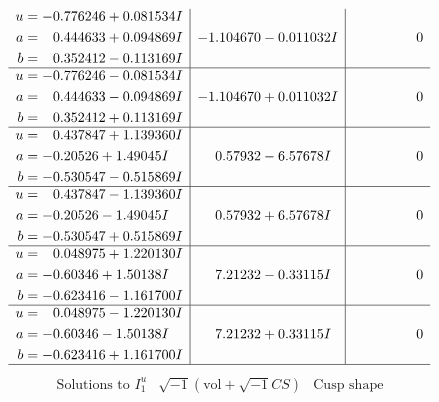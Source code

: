 \documentclass[1p]{elsarticle_modified}
\theoremstyle{definition}
\newcommand{\I}{\sqrt{-1}}
\begin{document}
$$\begin{array}{c|c|c}
\begin{aligned}
u &= -0.776246 + 0.081534 I \\
a &= \phantom{-}0.444633 + 0.094869 I \\
b &= \phantom{-}0.352412 - 0.113169 I\end{aligned}
 & -1.104670 - 0.011032 I & \phantom{-0.000000 } 0 \\ \hline\begin{aligned}
u &= -0.776246 - 0.081534 I \\
a &= \phantom{-}0.444633 - 0.094869 I \\
b &= \phantom{-}0.352412 + 0.113169 I\end{aligned}
 & -1.104670 + 0.011032 I & \phantom{-0.000000 } 0 \\ \hline\begin{aligned}
u &= \phantom{-}0.437847 + 1.139360 I \\
a &= -0.20526 + 1.49045 I \\
b &= -0.530547 - 0.515869 I\end{aligned}
 & \phantom{-}0.57932 - 6.57678 I & \phantom{-0.000000 } 0 \\ \hline\begin{aligned}
u &= \phantom{-}0.437847 - 1.139360 I \\
a &= -0.20526 - 1.49045 I \\
b &= -0.530547 + 0.515869 I\end{aligned}
 & \phantom{-}0.57932 + 6.57678 I & \phantom{-0.000000 } 0 \\ \hline\begin{aligned}
u &= \phantom{-}0.048975 + 1.220130 I \\
a &= -0.60346 + 1.50138 I \\
b &= -0.623416 - 1.161700 I\end{aligned}
 & \phantom{-}7.21232 - 0.33115 I & \phantom{-0.000000 } 0 \\ \hline\begin{aligned}
u &= \phantom{-}0.048975 - 1.220130 I \\
a &= -0.60346 - 1.50138 I \\
b &= -0.623416 + 1.161700 I\end{aligned}
 & \phantom{-}7.21232 + 0.33115 I & \phantom{-0.000000 } 0\\
 \hline 
 \end{array}$$\newpage$$\begin{array}{c|c|c}  
\text{Solutions to }I^u_{1}& \I (\text{vol} + \sqrt{-1}CS) & \text{Cusp shape}\\
 \hline 
\begin{aligned}

\end{aligned}
\end{array}$$
\end{document}
